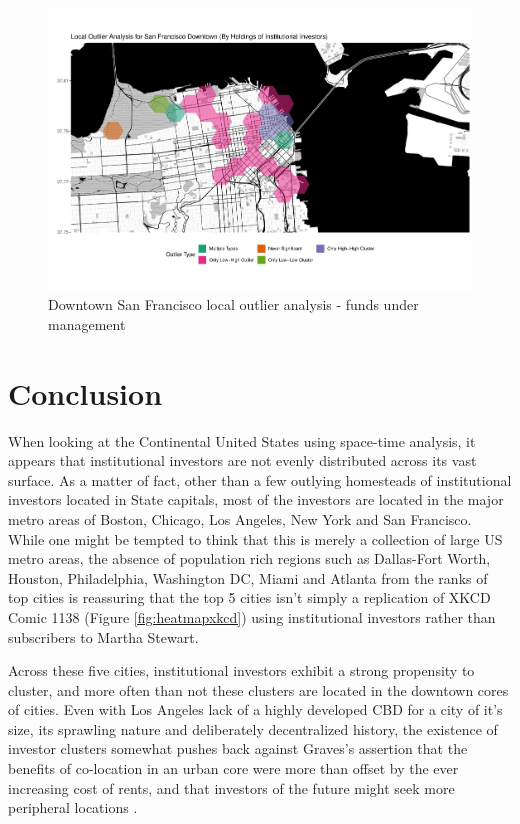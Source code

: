 \begin{figure}
	\centering
	\includegraphics[width=1\linewidth]{Figures/ChapterIV/SF_Money_LO_Downtown}
	\caption[Downtown San Francisco Local Outlier Analysis - Funds Under Management 2013-2018]{Downtown San Francisco local outlier analysis - funds under management}
	\label{fig:SFlocaloutlier_Downtown}
\end{figure}
\section{Conclusion}	


When looking at the Continental United States using space-time analysis, it appears that institutional investors are not evenly distributed across its vast surface.  As a matter of fact, other than a few outlying homesteads of institutional investors located in State capitals, most of the investors are located in the major metro areas of Boston, Chicago, Los Angeles, New York and San Francisco.  While one might be tempted to think that this is merely a collection of large US metro areas, the absence of population rich regions such as Dallas-Fort Worth, Houston, Philadelphia, Washington DC, Miami and Atlanta from the ranks of top cities is reassuring that the top 5 cities isn't simply a replication of XKCD Comic 1138 (Figure \ref{fig:heatmapxkcd}) using institutional investors rather than subscribers to Martha Stewart. 

Across these five cities, institutional investors exhibit a strong propensity to cluster, and more often than not these clusters are located in the downtown cores of cities.  Even with Los Angeles lack of a highly developed CBD for a city of it's size, its sprawling nature and deliberately decentralized history, the  existence of investor clusters somewhat pushes back against Graves's assertion that the benefits of co-location in an urban core were more than offset by the ever increasing cost of rents, and that investors of the future might seek more peripheral locations \citep{Graves2003}.   

